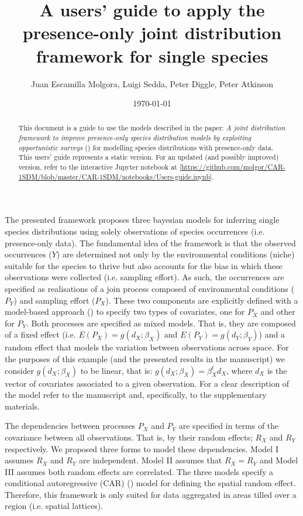 \documentclass[11pt]{article}
\author{Juan Escamilla Molgora, Luigi Sedda, Peter Diggle, Peter Atkinson}
\date{\today}
\title{A users' guide to apply the presence-only joint distribution framework for single species}
\begin{document}
\maketitle
\begin{abstract}
This document is a guide to use the models described in the paper: \emph{A joint distribution framework to improve presence-only species distribution models by exploiting opportunistic surveys} (\cite{EscamillaMolgora2021}) for modelling species distributions with presence-only data. This users' guide represents a static version. For an updated (and possibly improved) version, refer to the interactive Jupyter notebook at [\url{https://github.com/molgor/CAR-1SDM/blob/master/CAR-1SDM/notebooks/Users-guide.ipynb}].
\end{abstract}

The presented framework proposes three bayesian models for inferring single species distributions using solely observations of species occurrences (i.e. presence-only data).
The fundamental idea of the framework is that the observed occurrences (\(Y\)) are determined not only by the environmental conditions (niche) suitable for the species to thrive but also accounts for the bias in which these observations were collected (i.e. sampling effort). As such, the occurrences are specified as realisations of a join process composed of environmental conditions (\(P_Y\)) and sampling effort (\(P_X\)). These two components are explicitly defined with a model-based approach (\cite{Diggle2002}) to specify two types of covariates, one for \(P_X\) and other for \(P_Y\).
Both processes are specified as mixed models. That is, they are composed of  a fixed effect (i.e. \(E(P_X) = g(d_X;\beta_X)\) and \(E(P_Y) = g(d_Y;\beta_Y)\)) and a random effect that models the variation between observations across space. For the purposes of this example (and the presented results in the manuscript) we consider \(g(d_X;\beta_X)\) to be linear, that is: \(g(d_X;\beta_X) = \beta_X^t d_X\), where \(d_X\) is the vector of covariates associated to a given observation. For a clear description of the model refer to the manuscript and, specifically, to the supplementary materials.

The dependencies between processes \(P_X\) and \(P_Y\) are specified in terms of the covariance between all observations. That is, by their random effects; \(R_X\) and \(R_Y\) respectively. We proposed three forms to model these dependencies. Model I assumes \(R_X\) and \(R_Y\) are independent. Model II assumes that \(R_X = R_Y\) and Model III assumes both random effects are correlated. The three models specify a conditional autoregressive (CAR) (\cite{Besag1974}) model for defining the spatial random effect. Therefore, this framework is only suited for data aggregated in areas tilled over a region (i.e. spatial lattices).
\end{document}
